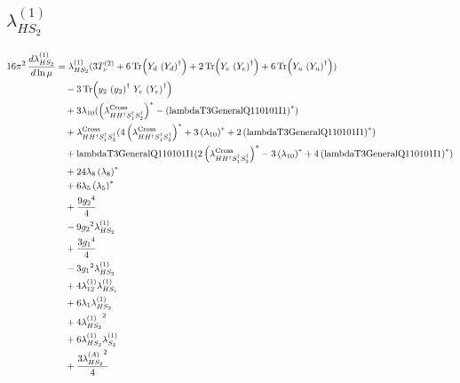 \documentclass[10pt,a4paper]{article}
\begin{document}
\subsection*{$\lambda_{HS_2}^{(1)}$}
\begin{align*}
16\pi^2\,\frac{d \lambda_{HS_2}^{(1)}}{d\ln\mu} &={\lambda_{HS_2}^{(1)}} (3 T_{\nu}^{(2)}+6 \operatorname{Tr}\!\left({Y_d}\,\left({Y_d}\right)^{\dagger}\right)+2 \operatorname{Tr}\!\left({Y_e}\,\left({Y_e}\right)^{\dagger}\right)+6 \operatorname{Tr}\!\left({Y_u}\,\left({Y_u}\right)^{\dagger}\right)) \\
&\quad -3 \operatorname{Tr}\!\left({y_2}\,\left({y_2}\right)^{\dagger}\,{Y_e}\,\left({Y_e}\right)^{\dagger}\right) \\
&\quad +3 {\lambda_{10}} (\left({\lambda_{H H^\dagger S_1^\dagger S_2^\dagger}^{\rm Cross}}\right)^{*}-\left(\text{lambdaT3GeneralQ110101I1}\right)^{*}) \\
&\quad +{\lambda_{H H^\dagger S_1^\dagger S_2^\dagger}^{\rm Cross}} (4 \left({\lambda_{H H^\dagger S_1^\dagger S_2^\dagger}^{\rm Cross}}\right)^{*}+3 \left({\lambda_{10}}\right)^{*}+2 \left(\text{lambdaT3GeneralQ110101I1}\right)^{*}) \\
&\quad +\text{lambdaT3GeneralQ110101I1} (2 \left({\lambda_{H H^\dagger S_1^\dagger S_2^\dagger}^{\rm Cross}}\right)^{*}-3 \left({\lambda_{10}}\right)^{*}+4 \left(\text{lambdaT3GeneralQ110101I1}\right)^{*}) \\
&\quad +24 {\lambda_{8}} \left({\lambda_{8}}\right)^{*} \\
&\quad +6 {\lambda_5} \left({\lambda_5}\right)^{*} \\
&\quad +\frac{9 {g_2}^4}{4} \\
&\quad -9 {g_2}^2 {\lambda_{HS_2}^{(1)}} \\
&\quad +\frac{3 {g_1}^4}{4} \\
&\quad -3 {g_1}^2 {\lambda_{HS_2}^{(1)}} \\
&\quad +4 {\lambda_{12}^{(1)}} {\lambda_{HS_1}^{(1)}} \\
&\quad +6 {\lambda_1} {\lambda_{HS_2}^{(1)}} \\
&\quad +4 {\lambda_{HS_2}^{(1)}}^2 \\
&\quad +6 {\lambda_{HS_2}^{(1)}} {\lambda_{S_2}^{(1)}} \\
&\quad +\frac{3 {\lambda_{HS_2}^{(A)}}^2}{4} \\
\end{align*}
\end{document}
